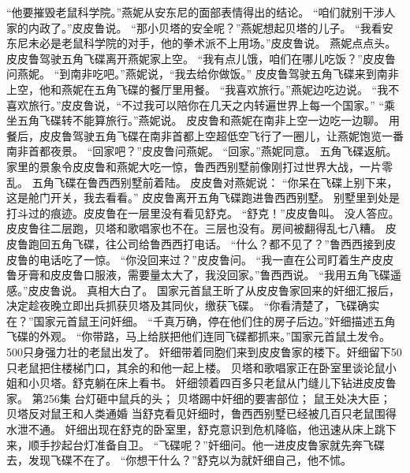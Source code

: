 \documentclass[a4paper,12pt,UTF8,twoside]{ctexbook}
\begin{document}
        “他要摧毁老鼠科学院。”燕妮从安东尼的面部表情得出的结论。  
        “咱们就别干涉人家的内政了。”皮皮鲁说。  
        “那小贝塔的安全呢？”燕妮想起贝塔的儿子。  
        “我看安东尼未必是老鼠科学院的对手，他的拳术派不上用场。”皮皮鲁说。  
        燕妮点点头。  
        皮皮鲁驾驶五角飞碟离开燕妮家上空。  
        “我有点儿饿，咱们在哪儿吃饭？”皮皮鲁问燕妮。  
        “到南非吃吧。”燕妮说，“我去给你做饭。”  
        皮皮鲁驾驶五角飞碟来到南非上空，他和燕妮在五角飞碟的餐厅里用餐。  
        “我喜欢旅行。”燕妮边吃边说。  
        “我不喜欢旅行。”皮皮鲁说，“不过我可以陪你在几天之内转遍世界上每一个国家。”  
        “乘坐五角飞碟转不能算旅行。”燕妮说。  
        皮皮鲁和燕妮在南非上空一边吃一边聊。  
        用餐后，皮皮鲁驾驶五角飞碟在南非首都上空超低空飞行了一圈儿，让燕妮饱览一番南非首都夜景。  
        “回家吧？”皮皮鲁问燕妮。  
        “回家。”燕妮同意。  
        五角飞碟返航。  
        家里的景象令皮皮鲁和燕妮大吃一惊，鲁西西别墅前像刚打过世界大战，一片零乱。  
        五角飞碟在鲁西西别墅前着陆。  
        皮皮鲁对燕妮说：  
        “你呆在飞碟上别下来，这是舱门开关，我去看看。”  
        皮皮鲁离开五角飞碟跑进鲁西西别墅。  
        别墅里到处是打斗过的痕迹。皮皮鲁在一层里没有看见舒克。  
        “舒克！”皮皮鲁叫。  
        没人答应。  
        皮皮鲁往二层跑，贝塔和歌唱家也不在。三层也没有。房间被翻得乱七八糟。  
        皮皮鲁跑回五角飞碟，往公司给鲁西西打电话。  
        “什么？都不见了？”鲁西西接到皮皮鲁的电话吃了一惊。  
        “你没回来过？”皮皮鲁问。  
        “我一直在公司盯着生产皮皮鲁牙膏和皮皮鲁口服液，需要量太大了，我没回家。”鲁西西说。  
        “我用五角飞碟遥感。”皮皮鲁说。  
        真相大白了。  
        国家元首鼠王昕了从皮皮鲁家回来的奸细汇报后，决定趁夜晚立即出兵抓获贝塔及其同伙，缴获飞碟。  
        “你看清楚了，飞碟确实在？”国家元首鼠王问奸细。  
        “千真万确，停在他们住的房子后边。”奸细描述五角飞碟的外观。  
        “你带路，马上给朕把他们连同飞碟都抓来。”国家元首鼠土发令。  
        500只身强力壮的老鼠出发了。  
        奸细带着同胞们来到皮皮鲁家的楼下。奸细留下50只老鼠把住楼梯门口，其余的和他一起上楼。  
        贝塔和歌唱家正在卧室里谈论鼠小姐和小贝塔。舒克躺在床上看书。  
        奸细领着四百多只老鼠从门缝儿下钻进皮皮鲁家。          第256集  
        台灯砸中鼠兵的头；  
        贝塔踢中奸细的要害部位；  
        鼠王处决大臣；  
        贝塔反对鼠王和人类通婚    
        当舒克看见奸细时，鲁西西别墅已经被几百只老鼠围得水泄不通。  
        奸细出现在舒克的卧室里，舒克意识到危机降临，他迅速从床上跳下来，顺手抄起台灯准备自卫。  
        “飞碟呢？”奸细问。他一进皮皮鲁家就先奔飞碟去，发现飞碟不在了。  
        “你想干什么？”舒克以为就奸细自己，他不怵。  
\end{document}
